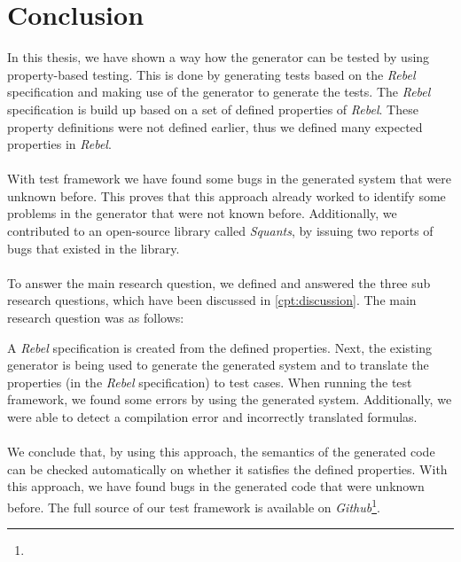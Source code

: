 \chapter{Conclusion}
\label{cpt:conclusion}
In this thesis, we have shown a way how the generator can be tested by using property-based testing. This is done by generating tests based on the \textit{Rebel} specification and making use of the generator to generate the tests. The \textit{Rebel} specification is build up based on a set of defined properties of \textit{Rebel}. These property definitions were not defined earlier, thus we defined many expected properties in \textit{Rebel}.\\
\\
With test framework we have found some bugs in the generated system that were unknown before. This proves that this approach already worked to identify some problems in the generator that were not known before. Additionally, we contributed to an open-source library called \textit{Squants}, by issuing two reports of bugs that existed in the library.\\
\\
To answer the main research question, we defined and answered the three sub research questions, which have been discussed in \autoref{cpt:discussion}. The main research question was as follows:
\begin{quote}
\rqMain
\end{quote}
A \textit{Rebel} specification is created from the defined properties. Next, the existing generator is being used to generate the generated system and to translate the properties (in the \textit{Rebel} specification) to test cases. When running the test framework, we found some errors by using the generated system. Additionally, we were able to detect a compilation error and incorrectly translated formulas.\\
\\
We conclude that, by using this approach, the semantics of the generated code can be checked automatically on whether it satisfies the defined properties. With this approach, we have found bugs in the generated code that were unknown before. The full source of our test framework is available on \textit{Github}\footnote{}.

